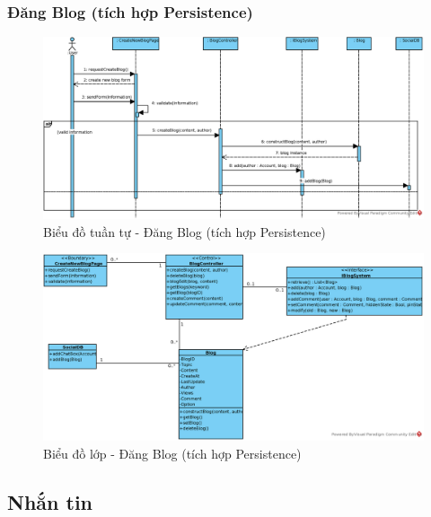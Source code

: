 \documentclass[./../main.tex]{subfiles}
\begin{document}
\subsubsection{Đăng Blog (tích hợp Persistence)}
\begin{figure}[H]
    \centering
    \includegraphics[width=\linewidth]{./images/UseCaseDesignDiagram/ucr_per_create_blog.eps}
    \caption{Biểu đồ tuần tự - Đăng Blog (tích hợp Persistence)}
\end{figure}
\begin{figure}[H]
    \centering
    \includegraphics[width=\linewidth]{./images/UseCaseDesignDiagram/ucd_per_blog.eps}
    \caption{Biểu đồ lớp - Đăng Blog (tích hợp Persistence)}
\end{figure}

\subsection{Nhắn tin}
\end{document}
